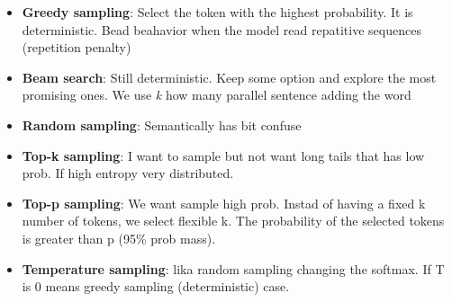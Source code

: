 \begin{itemize}
  \item \textbf{Greedy sampling}: Select the token with the highest probability. It is deterministic. Bead beahavior when
        the model read repatitive sequences (repetition penalty)
  \item \textbf{Beam search}: Still deterministic. Keep some option and explore the most promising ones. We use \textit{k} how many
        parallel sentence adding the word
  \item \textbf{Random sampling}: Semantically has bit confuse
  \item \textbf{Top-k sampling}: I want to sample but not want long tails that has low prob. If high entropy
        very distributed.
  \item \textbf{Top-p sampling}: We want sample high prob. Instad of having a fixed k number of tokens, we select flexible
        k. The probability of the selected tokens is greater than p (95\% prob mass).
  \item \textbf{Temperature sampling}: lika random sampling changing the softmax. If T is 0 means greedy sampling (deterministic) case.
\end{itemize}























